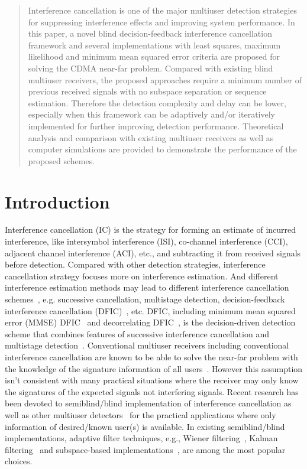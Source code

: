\documentclass[conference]{IEEEtran}
\begin{document}
\maketitle
\begin{abstract}\small
Interference cancellation is one of the major multiuser detection
strategies for suppressing interference effects and improving
system performance. In this paper, a novel blind decision-feedback
interference cancellation framework and several implementations
with least squares, maximum likelihood and minimum mean squared
error criteria are proposed for solving the CDMA near-far problem.
Compared with existing blind multiuser receivers, the proposed
approaches require a minimum number of previous received signals
with no subspace separation or sequence estimation. Therefore the
detection complexity and delay can be lower, especially when this
framework can be adaptively and/or iteratively implemented for
further improving detection performance. Theoretical analysis and
comparison with existing multiuser receivers as well as computer
simulations are provided to demonstrate the performance of the
proposed schemes.
\end{abstract}
\section{Introduction}
Interference cancellation (IC) is the strategy for forming an
estimate of incurred interference, like intersymbol interference
(ISI), co-channel interference (CCI), adjacent channel
interference (ACI), etc., and subtracting it from received signals
before detection. Compared with other detection strategies,
interference cancellation strategy focuses more on interference
estimation. And different interference estimation methods may lead
to different interference cancellation
schemes~\cite{Verd98,Wang02b}, e.g. successive cancellation,
multistage detection, decision-feedback interference cancellation
(DFIC)~\cite{Kave85,Duel95}, etc. DFIC, including minimum mean
squared error (MMSE) DFIC~\cite{Kave85} and decorrelating
DFIC~\cite{Duel95}, is the decision-driven detection scheme that
combines features of successive interference cancellation and
multistage detection~\cite{Verd98}. Conventional multiuser
receivers including conventional interference cancellation are
known to be able to solve the near-far problem with the knowledge
of the signature information of all users~\cite{Verd98}. However
this assumption isn't consistent with many practical situations
where the receiver may only know the signatures of the expected
signals not interfering signals. Recent research has been devoted
to semiblind/blind implementation of interference cancellation as
well as other multiuser
detectors~\cite{Madh94,Wang98,Zhang02,Wang03d,Wang05A} for the
practical applications where only information of desired/known
user(s) is available. In existing semiblind/blind implementations,
adaptive filter techniques, e.g., Wiener filtering~\cite{Madh94},
Kalman filtering~\cite{Zhang02} and subspace-based
implementations~\cite{Wang98}, are among the most popular choices.
\end{document}
